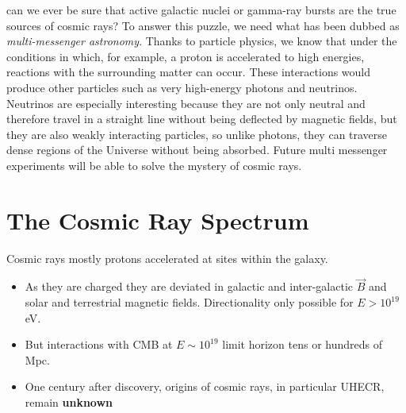 \documentclass[
  letterpaper,
  DIV=11,
  numbers=noendperiod]{scrreprt}
\providecommand{\tightlist}{%
  \setlength{\itemsep}{0pt}\setlength{\parskip}{0pt}}\usepackage{longtable,booktabs,array}
\begin{document}
can we ever be sure that active galactic nuclei or gamma-ray bursts are
the true sources of cosmic rays? To answer this puzzle, we need what has
been dubbed as \emph{multi-messenger astronomy}. Thanks to particle
physics, we know that under the conditions in which, for example, a
proton is accelerated to high energies, reactions with the surrounding
matter can occur. These interactions would produce other particles such
as very high-energy photons and neutrinos. Neutrinos are especially
interesting because they are not only neutral and therefore travel in a
straight line without being deflected by magnetic fields, but they are
also weakly interacting particles, so unlike photons, they can traverse
dense regions of the Universe without being absorbed. Future multi
messenger experiments will be able to solve the mystery of cosmic rays.

\section*{The Cosmic Ray Spectrum}\label{the-cosmic-ray-spectrum}


Cosmic rays mostly protons accelerated at sites within the galaxy.

\begin{itemize}
\tightlist
\item
  As they are charged they are deviated in galactic and inter-galactic
  \(\vec{B}\) and solar and terrestrial magnetic fields. Directionality
  only possible for \(E \gt 10^{19}\) eV.
\item
  But interactions with CMB at \(E \sim 10^{19}\) limit horizon tens or
  hundreds of Mpc.
\item
  One century after discovery, origins of cosmic rays, in particular
  UHECR, remain \textbf{unknown}
\end{itemize}
\end{document}
